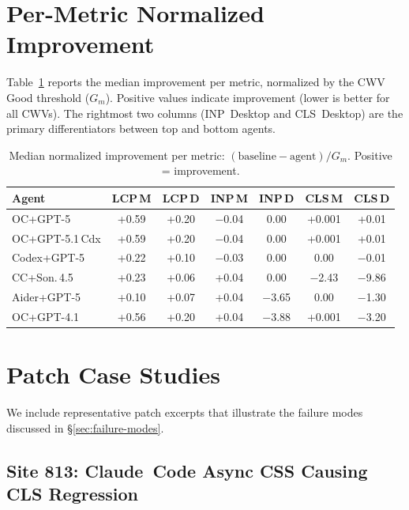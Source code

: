 \section{Per-Metric Normalized Improvement}
\label{app:per-metric}

Table~\ref{tab:per-metric-full} reports the median improvement per metric, normalized by the CWV Good threshold ($G_m$). Positive values indicate improvement (lower is better for all CWVs). The rightmost two columns (INP~Desktop and CLS~Desktop) are the primary differentiators between top and bottom agents.

\begin{table}[h]
\centering
\small
\caption{Median normalized improvement per metric: $(\text{baseline} - \text{agent}) / G_m$. Positive = improvement.}
\label{tab:per-metric-full}
\begin{tabular}{lcccccc}
\toprule
\textbf{Agent} & \textbf{LCP\,M} & \textbf{LCP\,D} & \textbf{INP\,M} & \textbf{INP\,D} & \textbf{CLS\,M} & \textbf{CLS\,D} \\
\midrule
OC+GPT-5       & +0.59 & +0.20 & $-$0.04 & 0.00   & +0.001 & +0.01  \\
OC+GPT-5.1\,Cdx & +0.59 & +0.20 & $-$0.04 & 0.00   & +0.001 & +0.01  \\
Codex+GPT-5    & +0.22 & +0.10 & $-$0.03 & 0.00   & 0.00   & $-$0.01 \\
CC+Son.\,4.5    & +0.23 & +0.06 & +0.04  & 0.00   & $-$2.43 & $-$9.86 \\
Aider+GPT-5    & +0.10 & +0.07 & +0.04  & $-$3.65 & 0.00   & $-$1.30 \\
OC+GPT-4.1     & +0.56 & +0.20 & +0.04  & $-$3.88 & +0.001 & $-$3.20 \\
\bottomrule
\end{tabular}
\end{table}

\section{Patch Case Studies}
\label{app:patches}

We include representative patch excerpts that illustrate the failure modes discussed in \S\ref{sec:failure-modes}.

\subsection{Site 813: Claude~Code Async CSS Causing CLS Regression}
\label{app:patch-813-cc}

